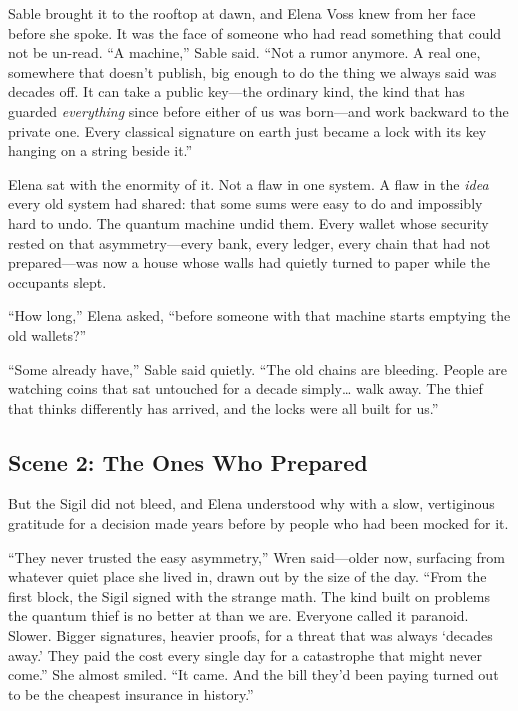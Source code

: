 \documentclass[12pt,letterpaper]{book}
\begin{document}
Sable brought it to the rooftop at dawn, and Elena Voss knew from her face before
she spoke. It was the face of someone who had read something that could not be
un-read. ``A machine,'' Sable said. ``Not a rumor anymore. A real one, somewhere
that doesn't publish, big enough to do the thing we always said was decades off.
It can take a public key---the ordinary kind, the kind that has guarded
\emph{everything} since before either of us was born---and work backward to the
private one. Every classical signature on earth just became a lock with its key
hanging on a string beside it.''

Elena sat with the enormity of it. Not a flaw in one system. A flaw in the
\emph{idea} every old system had shared: that some sums were easy to do and
impossibly hard to undo. The quantum machine undid them. Every wallet whose
security rested on that asymmetry---every bank, every ledger, every chain that had
not prepared---was now a house whose walls had quietly turned to paper while the
occupants slept.

``How long,'' Elena asked, ``before someone with that machine starts emptying the
old wallets?''

``Some already have,'' Sable said quietly. ``The old chains are bleeding. People
are watching coins that sat untouched for a decade simply\ldots{} walk away. The
thief that thinks differently has arrived, and the locks were all built for us.''

\hypertarget{scene-2-the-ones-who-prepared}{%
\subsection{Scene 2: The Ones Who
Prepared}\label{scene-2-the-ones-who-prepared}}

But the Sigil did not bleed, and Elena understood why with a slow, vertiginous
gratitude for a decision made years before by people who had been mocked for it.

``They never trusted the easy asymmetry,'' Wren said---older now, surfacing from
whatever quiet place she lived in, drawn out by the size of the day. ``From the
first block, the Sigil signed with the strange math. The kind built on problems the
quantum thief is no better at than we are. Everyone called it paranoid. Slower.
Bigger signatures, heavier proofs, for a threat that was always `decades away.'
They paid the cost every single day for a catastrophe that might never come.'' She
almost smiled. ``It came. And the bill they'd been paying turned out to be the
cheapest insurance in history.''
\end{document}
